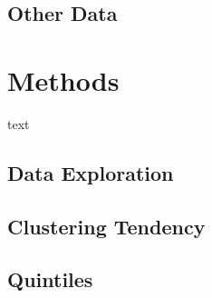 \documentclass[11pt, a4paper]{article}
\begin{document}
\subsection{Other Data}
























\pagebreak 
\section{Methods}



text






\subsection{Data Exploration}

















\subsection{Clustering Tendency}













\subsection{Quintiles}
\end{document}
